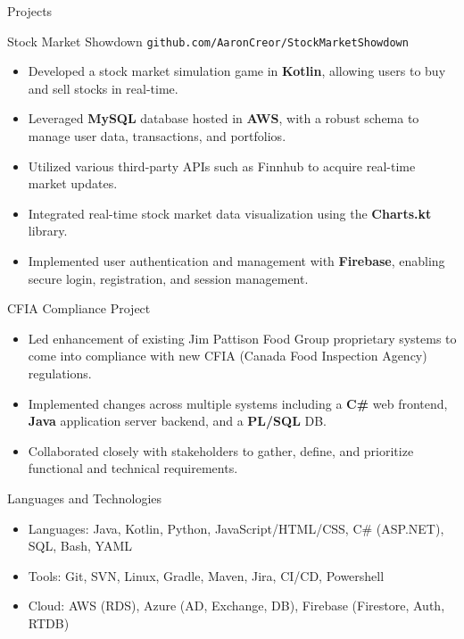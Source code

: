 \documentclass[]{mcdowellcv}
\begin{document}
	\begin{cvsection}{Projects}
		\begin{cvsubsection}{Stock Market Showdown}{}{}
		\texttt{github.com/AaronCreor/StockMarketShowdown}
			\begin{itemize}
				\item Developed a stock market simulation game in \textbf{Kotlin}, allowing users to buy and sell stocks in real-time.
				\item Leveraged \textbf{MySQL} database hosted in \textbf{AWS}, with a robust schema to manage user data, transactions, and portfolios.
				\item Utilized various third-party APIs such as Finnhub to acquire real-time market updates.
				\item Integrated real-time stock market data visualization using the \textbf{Charts.kt} library.
				\item Implemented user authentication and management with \textbf{Firebase}, enabling secure login, registration, and session management.
			\end{itemize}
		\end{cvsubsection}
		\begin{cvsubsection}{CFIA Compliance Project}{}{}
			\begin{itemize}
				\item Led enhancement of existing Jim Pattison Food Group proprietary systems to come into compliance with new CFIA (Canada Food Inspection Agency) regulations.
				\item Implemented changes across multiple systems including a \textbf{C\#} web frontend, \textbf{Java} application server backend, and a \textbf{PL/SQL} DB.
				\item Collaborated closely with stakeholders to gather, define, and prioritize functional and technical requirements.
			\end{itemize}
		\end{cvsubsection}
	\end{cvsection}
	
	\begin{cvsection}{Languages and Technologies}
		\begin{cvsubsection}{}{}{}	
			\begin{itemize}
				\item Languages: Java, Kotlin, Python, JavaScript/HTML/CSS, C\# (ASP.NET), SQL, Bash, YAML
				\item Tools: Git, SVN, Linux, Gradle, Maven, Jira, CI/CD, Powershell
				\item Cloud: AWS (RDS), Azure (AD, Exchange, DB), Firebase (Firestore, Auth, RTDB)
			\end{itemize}
		\end{cvsubsection}
	\end{cvsection}
	
\end{document}
